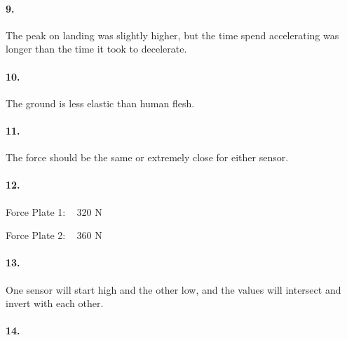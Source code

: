         \paragraph*{9.}

        \begin{mdframed}
            The peak on landing was slightly higher, but the time spend accelerating was longer than the time it took to decelerate.
        \end{mdframed}

        \paragraph*{10.}

        \begin{mdframed}
            The ground is less elastic than human flesh.
        \end{mdframed}

        \paragraph*{11.}

        \begin{mdframed}
            The force should be the same or extremely close for either sensor.
        \end{mdframed}

        \paragraph*{12.}

        \begin{mdframed}
            Force Plate 1: ~ 320 N
            
            Force Plate 2: ~ 360 N
        \end{mdframed}

        \paragraph*{13.}

        \begin{mdframed}
            One sensor will start high and the other low, and the values will intersect and invert with each other.
        \end{mdframed}

        \paragraph*{14.}

